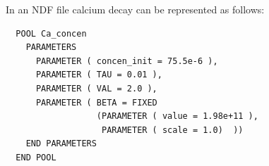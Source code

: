 \documentclass[11pt,3p,twocolumn]{JMN}
\begin{document}


In an NDF file calcium decay  can be represented as follows:

\begin{tiny}
\begin{verbatim}
  POOL Ca_concen
    PARAMETERS
      PARAMETER ( concen_init = 75.5e-6 ),
      PARAMETER ( TAU = 0.01 ),
      PARAMETER ( VAL = 2.0 ),
      PARAMETER ( BETA = FIXED
                  (PARAMETER ( value = 1.98e+11 ),
                   PARAMETER ( scale = 1.0)  ))
    END PARAMETERS
  END POOL
\end{verbatim}
\end{tiny}
\end{document}
